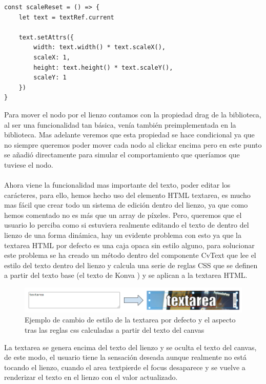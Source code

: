 \newpage

\begin{lstlisting}[caption={Sobrecarga del reescalado del nodo CvText}]
const scaleReset = () => {
    let text = textRef.current

    text.setAttrs({
        width: text.width() * text.scaleX(),
        scaleX: 1,
        height: text.height() * text.scaleY(),
        scaleY: 1
    })
}
\end{lstlisting}

Para mover el nodo por el lienzo contamos con la propiedad drag de la biblioteca, al ser
una funcionalidad tan básica, venía también preimplementada en la biblioteca.
Mas adelante veremos que esta propiedad se hace condicional ya que no siempre queremos
poder mover cada nodo al clickar encima pero en este punto se añadió directamente para
simular el comportamiento que queríamos que tuviese el nodo.
\\\\
Ahora viene la funcionalidad mas importante del texto, poder editar los 
carácteres, para ello, hemos hecho uso del elemento HTML textarea, es mucho mas
fácil que crear todo un sistema de edición dentro del lienzo, ya que como hemos comentado
no es más que un array de píxeles. Pero, queremos que el usuario lo perciba como si estuviera
realmente editando el texto de dentro del lienzo de una forma dinámica,
hay un evidente problema con esto ya que la textarea HTML por defecto es una caja opaca
sin estilo alguno, para solucionar este problema se ha creado un método dentro del 
componente CvText que lee el estilo del texto dentro del lienzo y calcula una serie
de reglas CSS que se definen a partir del texto base (el texto de Konva \cite{KonvaJS})
y se aplican a la textarea HTML.

\begin{figure}[!h]
  \centering
    \includegraphics[scale=0.55]{img/textareadiff.png}
  \caption{Ejemplo de cambio de estilo de la textarea por defecto y el aspecto tras las reglas css calculadas a partir del texto del canvas}
\end{figure}

La textarea se genera encima del texto del lienzo y se oculta el texto del canvas,
de este modo, el usuario tiene la sensación deseada aunque realmente no está tocando
el lienzo, cuando el area textpierde el focus desaparece y se vuelve a renderizar el 
texto en el lienzo con el valor actualizado.

